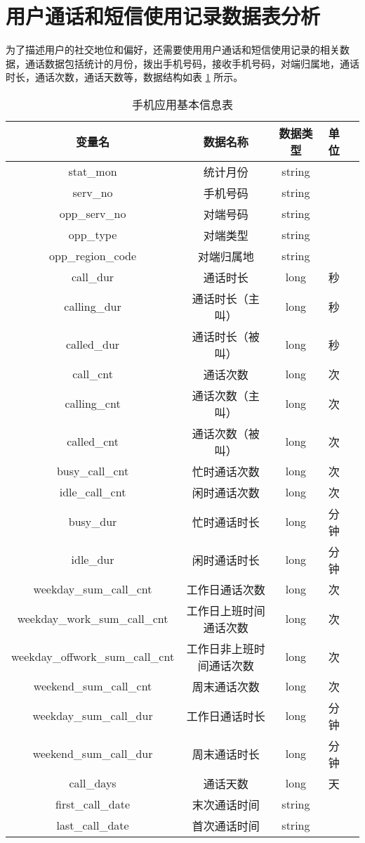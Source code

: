 \section{用户通话和短信使用记录数据表分析}

为了描述用户的社交地位和偏好，还需要使用用户通话和短信使用记录的相关数据，通话数据包括统计的月份，拨出手机号码，接收手机号码，对端归属地，通话时长，通话次数，通话天数等，数据结构如表 \ref{tab:call_data} 所示。

\begin{table}[htbp]
    \caption{手机应用基本信息表}
    \vspace{0.5em}\centering\wuhao
    \begin{tabular}{ccccc}
        \toprule[1.5pt]
        变量名 & 数据名称 & 数据类型 & 单位 \\
        \midrule[1pt]
        stat\_mon & 统计月份 & string & \\
        serv\_no & 手机号码 & string & \\
        opp\_serv\_no & 对端号码 & string & \\
        opp\_type & 对端类型 & string & \\
        opp\_region\_code & 对端归属地 & string & \\
        call\_dur & 通话时长 & long & 秒 \\
        calling\_dur & 通话时长（主叫） & long & 秒 \\
        called\_dur & 通话时长（被叫） & long & 秒 \\
        call\_cnt & 通话次数 & long & 次 \\
        calling\_cnt & 通话次数（主叫） & long & 次 \\
        called\_cnt & 通话次数（被叫） & long & 次 \\
        busy\_call\_cnt & 忙时通话次数 & long & 次 \\
        idle\_call\_cnt & 闲时通话次数 & long & 次 \\
        busy\_dur & 忙时通话时长 & long & 分钟 \\
        idle\_dur & 闲时通话时长 & long & 分钟 \\
        weekday\_sum\_call\_cnt & 工作日通话次数 & long & 次 \\
        weekday\_work\_sum\_call\_cnt & 工作日上班时间通话次数 & long & 次 \\
        weekday\_offwork\_sum\_call\_cnt & 工作日非上班时间通话次数 & long & 次 \\
        weekend\_sum\_call\_cnt & 周末通话次数 & long & 次 \\
        weekday\_sum\_call\_dur & 工作日通话时长 & long & 分钟 \\
        weekend\_sum\_call\_dur & 周末通话时长 & long & 分钟 \\
        call\_days & 通话天数 & long & 天 \\
        first\_call\_date & 末次通话时间 & string & \\
        last\_call\_date & 首次通话时间 & string & \\
        \bottomrule[1.5pt]
    \end{tabular}
    \label{tab:call_data}
\end{table}

